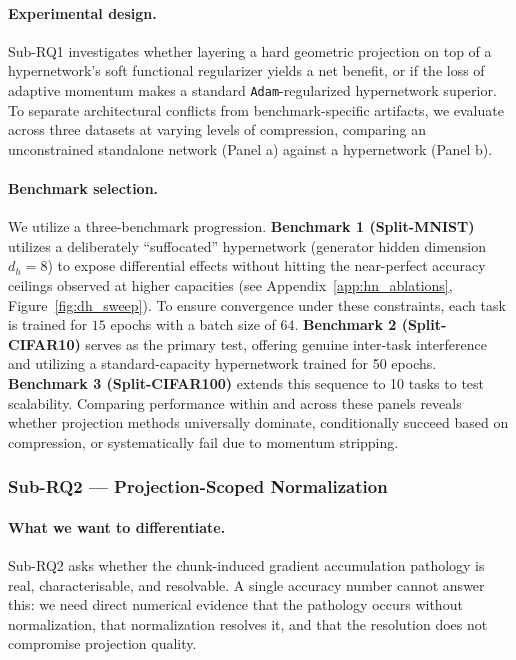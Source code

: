 \paragraph{Experimental design.}
Sub-RQ1 investigates whether layering a hard geometric projection on top of a 
hypernetwork's soft functional regularizer yields a net benefit, or if the 
loss of adaptive momentum makes a standard \texttt{Adam}-regularized hypernetwork 
superior. To separate architectural conflicts from benchmark-specific artifacts, 
we evaluate across three datasets at varying levels of compression, comparing 
an unconstrained standalone network (Panel a) against a hypernetwork (Panel b).

\paragraph{Benchmark selection.}
We utilize a three-benchmark progression. \textbf{Benchmark 1 (Split-MNIST)} 
utilizes a deliberately ``suffocated'' hypernetwork (generator hidden dimension 
$d_h = 8$) to expose differential effects without hitting the near-perfect accuracy 
ceilings observed at higher capacities (see Appendix~\ref{app:hn_ablations}, Figure~\ref{fig:dh_sweep}). To ensure convergence under these constraints, each task is trained for 
$15$ epochs with a batch size of $64$. \textbf{Benchmark 2 (Split-CIFAR10)} serves 
as the primary test, offering genuine inter-task interference and utilizing a 
standard-capacity hypernetwork trained for 50 epochs. \textbf{Benchmark 3 (Split-CIFAR100)} 
extends this sequence to 10 tasks to test scalability. Comparing performance 
within and across these panels reveals whether projection methods universally 
dominate, conditionally succeed based on compression, or systematically fail 
due to momentum stripping.

\subsubsection{Sub-RQ2 --- Projection-Scoped Normalization}
\label{sec:design_rq2}

\paragraph{What we want to differentiate.}
Sub-RQ2 asks whether the chunk-induced gradient accumulation pathology is
real, characterisable, and resolvable.
A single accuracy number cannot answer this: we need direct numerical
evidence that the pathology occurs without normalization, that normalization
resolves it, and that the resolution does not compromise projection quality.

